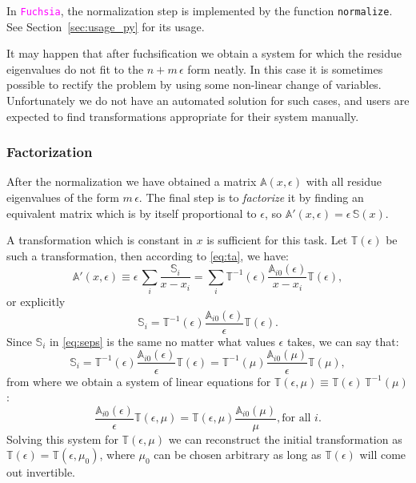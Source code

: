 \documentclass{elsarticle}
\newcommand{\eps}{\epsilon}
\newcommand{\fuchsia}{\textcolor{fuchsia}{\texttt{Fuchsia}}\xspace}
\newcommand{\code}[1]{\texttt{#1}}
\newcommand{\M}[1]{\mathbb{#1}} %
\begin{document}
In \fuchsia, the normalization step is implemented by the function \code{normalize}.
See Section~\ref{sec:usage_py} for its usage.

It may happen that after fuchsification we obtain a system for which the residue eigenvalues do not fit to the $n+m\,\eps$ form neatly.
In this case it is sometimes possible to rectify the problem by using some non-linear change of variables.
Unfortunately we do not have an automated solution for such cases, and users are expected to find transformations appropriate for their system manually.


\subsubsection{Factorization}
\label{sec:fact}
After the normalization we have obtained a matrix $\M A(x,\eps)$ with all residue eigenvalues of the form $m\,\eps$.
The final step is to \textit{factorize} it by finding an equivalent matrix which is by itself proportional to $\eps$, so $\M A'(x,\eps)=\eps\,\M S(x)$.

A transformation which is constant in $x$ is sufficient for this task.
Let $\M T(\eps)$ be such a transformation, then according to \eqref{eq:ta}, we have:
\begin{equation}
  \M A'(x,\eps) \equiv \eps\, \sum_i \frac{\M S_i}{x-x_i} = \sum_i \M T^{-1}(\eps) \frac{\M A_{i0}(\eps)}{x-x_i} \M T(\eps),
\end{equation}
or explicitly
\begin{equation}
\label{eq:seps}
  \M S_i = \M T^{-1}(\eps) \frac{\M A_{i0}(\eps)}{\eps} \M T(\eps).
\end{equation}
Since $\M S_i$ in \eqref{eq:seps} is the same no matter what values $\eps$ takes, we can say that:
\begin{equation}
  \M S_i = \M T^{-1}(\eps) \frac{\M A_{i0}(\eps)}{\eps} \M T(\eps) =
    \M T^{-1}(\mu) \frac{\M A_{i0}(\mu)}{\eps} \M T(\mu),
\end{equation}
from where we obtain a system of linear equations for $\M T(\eps,\mu) \equiv \M T(\eps) \, \M T^{-1}(\mu)$:
\begin{equation}
  \frac{\M A_{i0}(\eps)}{\eps} \M T(\eps,\mu) = \M T(\eps,\mu) \frac{\M A_{i0}(\mu)}{\mu}, \text{for all $i$.}
\end{equation}
Solving this system for $\M T(\eps,\mu)$ we can reconstruct the initial transformation as $\M T(\eps) = \M T(\eps,\mu_0)$, where $\mu_0$ can be chosen arbitrary as long as $\M T(\eps)$ will come out invertible.
\end{document}
